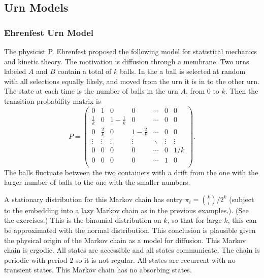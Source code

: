 \documentclass[12pt]{article}
\begin{document}
\subsection*{Urn Models}

\subsubsection*{Ehrenfest Urn Model}

The physicist P. Ehrenfest proposed the following model for statistical
mechanics and kinetic theory.  The motivation is diffusion through a
membrane.  Two urns labeled \( A \) and \( B \) contain a total of \( k \)
balls.  In the  a%
ball is selected at random with all selections equally likely, and moved
from the urn it is in to the other urn.  The state at each time is the
number of balls in the urn \( A \), from \( 0 \) to \( k \).  Then the
transition probability matrix is
\[
    P =
    \begin{pmatrix}
        0 & 1 & 0 & 0 & \cdots & 0 & 0 \\
        \frac{1}{k} & 0 & 1-\frac{1}{k} & 0 & \cdots & 0 & 0 \\
        0 & \frac{2}{k} & 0 & 1-\frac{2}{k} & \cdots & 0 & 0 \\
        \vdots & \vdots & \vdots & \vdots & \ddots& \vdots & \vdots \\
        0 & 0 & 0 & 0 & \cdots & 0 & 1/k \\
        0 & 0 & 0 & 0 & \cdots & 1 & 0 \\
    \end{pmatrix}
    .
\] The balls fluctuate between the two containers with a drift from the
one with the larger number of balls to the one with the smaller numbers.

A stationary distribution for this Markov chain has entry \( \pi_i =
\binom{k}{i}/2^k \) (subject to the embedding into a lazy Markov chain
as in the previous examples.).  (See the exercises.) This is the
binomial distribution on \( k \), so that for large \( k \), this can be
approximated with the normal distribution.  This conclusion is plausible
given the physical origin of the Markov chain as a model for diffusion.
This Markov chain is ergodic.  All states are accessible and all states
communicate.  The chain is periodic with period \( 2 \) so it is not
regular.  All states are recurrent with no transient states.  This
Markov chain has no absorbing states.
\end{document}
